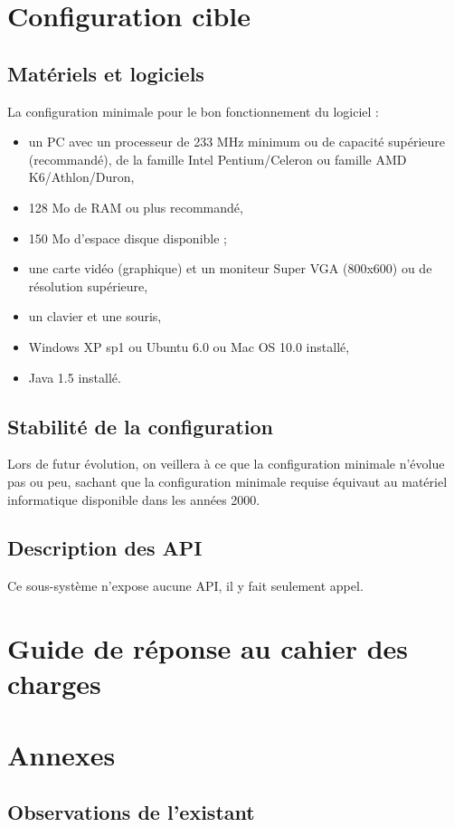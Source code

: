 \section{Configuration cible}
\subsection{Matériels et logiciels}
La configuration minimale pour le bon fonctionnement du logiciel : 
\begin{itemize}
	\item un PC avec un processeur de 233 MHz minimum ou de capacité supérieure (recommandé), de la famille Intel Pentium/Celeron ou famille AMD K6/Athlon/Duron,
	\item 128 Mo de RAM ou plus recommandé,
	\item 150 Mo d'espace disque disponible ;
	\item une carte vidéo (graphique) et un moniteur Super VGA (800x600) ou de résolution supérieure,
	\item un clavier et une souris,
	\item Windows XP sp1 ou Ubuntu 6.0 ou Mac OS 10.0 installé,
	\item Java 1.5 installé.
\end{itemize}

\subsection{Stabilité de la configuration}
Lors de futur évolution, on veillera à ce que la configuration minimale n'évolue pas ou peu, sachant que la configuration minimale requise équivaut au matériel informatique disponible dans les années 2000.

\subsection{Description des API}
Ce sous-système n'expose aucune API, il y fait seulement appel.

\section{Guide de réponse au cahier des charges}


\section{Annexes}
\subsection{Observations de l'existant}
